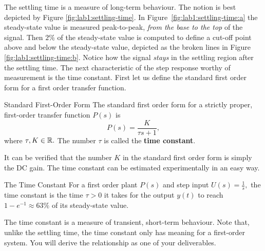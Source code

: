 %
The settling time is a measure of long-term behaviour.
The notion is best depicted by Figure
\ref{fig:lab1:settling-time}.
In Figure~\ref{fig:lab1:settling-time:a} the steady-state value is
measured peak-to-peak, \emph{from the base to the top} of the signal.
Then \(2\%\) of the
steady-state value is computed to define a cut-off point above and below the
steady-state value, depicted as the broken lines in Figure
\ref{fig:lab1:settling-time:b}. Notice how the signal \emph{stays} in the
settling region after the settling time.
The next characteristic of the step response worthy of measurement is the
time constant. First let us define the standard first order form for a first
order transfer function.
%
\begin{definition}[]{Standard First-Order Form}
  The standard first order form for a strictly proper, first-order transfer
  function \(P(s)\) is
  \[
    P(s) = \frac{K}{\tau s + 1},
  \]
  where \(\tau, K \in \mathbb{R}.\) The number \(\tau\) is called the \textbf{time
  constant}.
\end{definition}
%
It can be verified that the number \(K\) in the standard first order form
is simply the DC gain. The time constant can be estimated experimentally
in an easy way.
%
\begin{definition}[]{The Time Constant}
  For a first order plant \(P(s)\) and step input \(U(s) = \frac{1}{s},\)
  the time constant is the time \(\tau > 0\) it takes for
  the output \(y(t)\) to reach \(1-e^{-1} \approx 63\%\) of its steady-state value.
\end{definition}
%
The time constant is a measure of transient, short-term behaviour. Note that,
unlike the settling time, the time constant only has meaning for a
first-order system. You will derive the relationship as one of your
deliverables.
%
